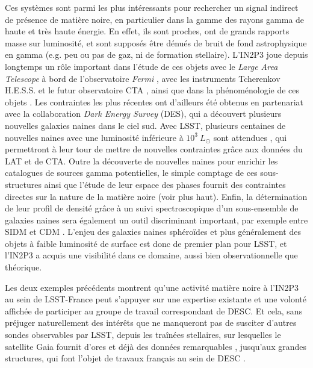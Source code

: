 \documentclass[12pt]{article}
\begin{document}
 Ces systèmes sont parmi les plus intéressants pour rechercher un signal indirect de présence de matière noire, en particulier dans la gamme des rayons gamma de haute et très haute énergie. En effet, ils sont proches, ont de grands rapports masse sur luminosité, et sont supposés être dénués de bruit de fond astrophysique en gamma (e.g. peu ou pas de gaz, ni de formation stellaire).
L'IN2P3 joue depuis longtemps un rôle important dans l'étude de ces objets avec le {\it Large Area Telescope} à bord de l'observatoire {\it Fermi} \citep[e.g.][]{1108.3546,1503.02641,2015MNRAS.453..849B,2017MNRAS.466..669C}, avec les instruments Tcherenkov H.E.S.S. et le futur observatoire CTA \citep[e.g.][]{Abramowski:2014tra,2019ICRC...36..539O,2019ICRC...36..542R}, ainsi que dans la phénoménologie de ces objets \citep[e.g.][]{2015MNRAS.446.3002B}. Les contraintes les plus récentes ont d'ailleurs été obtenus en partenariat avec la collaboration {\it Dark Energy Survey} (DES), qui a découvert plusieurs nouvelles galaxies naines dans le ciel sud. Avec LSST, plusieurs centaines de nouvelles naines avec une luminosité inférieure à $10^3\ L_\odot$ sont attendues \citep{Hargis:2014}, qui permettront à leur tour de mettre de nouvelles contraintes grâce aux données du LAT et de CTA.
Outre la découverte de nouvelles naines pour enrichir les catalogues de sources gamma potentielles, le simple comptage de ces sous-structures ainsi que l'étude de leur espace des phases fournit des contraintes directes sur la nature de la matière noire (voir plus haut).
Enfin, la détermination de leur profil de densité grâce à un suivi spectroscopique d'un sous-ensemble de galaxies naines sera également un outil discriminant important, par exemple entre SIDM et CDM \citep{2012MNRAS.423.3740V,Peter:2013,Nishikawa:2019lsc}.
L’enjeu des galaxies naines sphéroïdes et plus généralement des objets à faible luminosité de surface est donc de premier plan pour LSST, et l'IN2P3 a acquis une visibilité dans ce domaine, aussi bien observationnelle que théorique. 




Les deux exemples précédents montrent qu'une activité matière noire à l'IN2P3 au sein de LSST-France peut s'appuyer sur une expertise existante et une volonté affichée de participer au groupe de travail correspondant de DESC. Et cela, sans préjuger naturellement des intérêts que ne manqueront pas de susciter d'autres sondes observables par LSST, depuis les traînées stellaires, sur lesquelles le satellite Gaia fournit d'ores et déjà des données remarquables \citep{2018MNRAS.473.2060J,2018JCAP...07..061B}, jusqu'aux grandes structures, qui font l'objet de travaux français au sein de DESC \citep{2019arXiv190609042B,2019A&A...623A..76A,2017ApJ...845...28C}.
\end{document}
